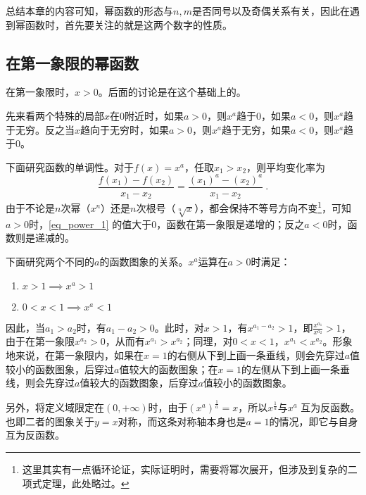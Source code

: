 总结本章的内容可知，幂函数的形态与$n,m$是否同号以及奇偶关系有关，因此在遇到幂函数时，首先要关注的就是这两个数字的性质。

\subsection{在第一象限的幂函数}

在第一象限时，$x>0$。后面的讨论是在这个基础上的。

先来看两个特殊的局部$x$在$0$附近时，如果$a>0$，则$x^a$趋于$0$，如果$a<0$，则$x^a$趋于无穷。反之当$x$趋向于无穷时，如果$a>0$，则$x^a$趋于无穷，如果$a<0$，则$x^a$趋于0。

下面研究函数的单调性。对于$f(x)=x^a$，任取$x_1>x_2$，则平均变化率为
\begin{equation}\label{eq_power_1}
\frac{f(x_1)-f(x_2)}{x_1-x_2}=\frac{(x_1)^a-(x_2)^a}{x_1-x_2}~.
\end{equation}
由于不论是$n$次幂（$x^n$）还是$n$次根号（$\sqrt[n]{x}$），都会保持不等号方向不变\footnote{这里其实有一点循环论证，实际证明时，需要将幂次展开，但涉及到复杂的二项式定理，此处略过。}，可知$a>0$时，\autoref{eq_power_1} 的值大于$0$，函数在第一象限是递增的；反之$a<0$时，函数则是递减的。

下面研究两个不同的$a$的函数图象的关系。$x^a$运算在$a>0$时满足：
\begin{enumerate}
\item $x>1\implies x^a>1$
\item $0<x<1\implies x^a<1$
\end{enumerate}

因此，当$a_1>a_2$时，有$a_1-a_2>0$。此时，对$x>1$，有$x^{a_1-a_2}>1$，即$\displaystyle \frac{x^{a_1}}{x^{a_2}}>1$，由于在第一象限$x^{a_2}>0$，从而有$x^{a_1}>x^{a_2}$；同理，对$0<x<1$，$x^{a_1}<x^{a_2}$。形象地来说，在第一象限内，如果在$x=1$的右侧从下到上画一条垂线，则会先穿过$a$值较小的函数图象，后穿过$a$值较大的函数图象；在$x=1$的左侧从下到上画一条垂线，则会先穿过$a$值较大的函数图象，后穿过$a$值较小的函数图象。

另外，将定义域限定在$(0,+\infty)$时，由于$\displaystyle(x^a)^{\frac{1}{a}}=x$，所以$\displaystyle x^{\frac{1}{a}}$与$x^a$ 互为反函数。也即二者的图象关于$y=x$对称，而这条对称轴本身也是$a=1$的情况，即它与自身互为反函数。

